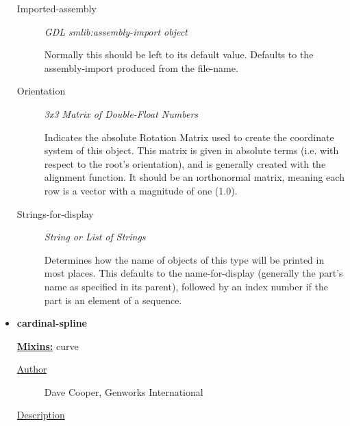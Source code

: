 \documentclass [11pt]{book}
\begin{document}
\begin{itemize}
\begin{description}
\begin{description}
\end{description}





\item [Imported-assembly]
\emph{GDL smlib:assembly-import object}

 Normally this should be left to its default value.
Defaults to the assembly-import produced from the file-name.




\item [Orientation]
\emph{3x3 Matrix of Double-Float Numbers}

 Indicates the absolute Rotation Matrix used to create
the coordinate system of this object. This matrix is given in absolute terms (i.e. with
respect to the root's orientation), and is generally created with the alignment function.
It should be an 
\i{orthonormal} matrix, meaning each row is a vector with a magnitude
of one (1.0).




\item [Strings-for-display]
\emph{String or List of Strings}

 Determines how the name of objects of
this type will be printed in most places.  This defaults to the
name-for-display (generally the part's name as specified in its
parent), followed by an index number if the part is an element of a
sequence.




\end{description}







\item {}
\label{prim:cardinal-spline}
\textbf{cardinal-spline}


\textbf{
\underline{Mixins:}} curve





\begin{description}

\item [
\underline{Author}]


Dave Cooper, Genworks International



\item [
\underline{Description}]



\end{description}
\end{itemize}
\end{document}
